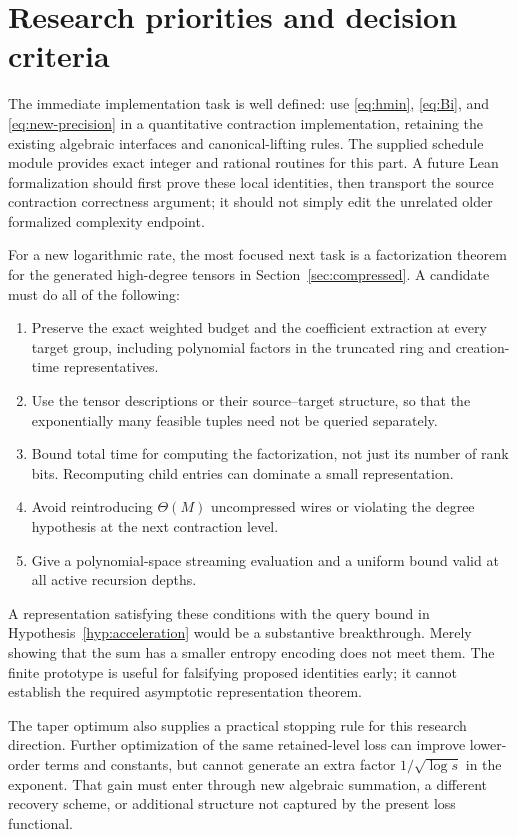 \documentclass[11pt,letterpaper]{article}
\numberwithin{equation}{section}
\theoremstyle{definition}
\theoremstyle{remark}
\begin{document}
\section{Research priorities and decision criteria}
\label{sec:research}

The immediate implementation task is well defined: use
\eqref{eq:hmin}, \eqref{eq:Bi}, and \eqref{eq:new-precision} in a
quantitative contraction implementation, retaining the existing algebraic
interfaces and canonical-lifting rules. The supplied schedule module
provides exact integer and rational routines for this part. A future Lean
formalization should first prove these local identities, then transport
the source contraction correctness argument; it should not simply edit
the unrelated older formalized complexity endpoint.

For a new logarithmic rate, the most focused next task is a factorization
theorem for the generated high-degree tensors in Section~\ref{sec:compressed}.
A candidate must do all of the following:
\begin{enumerate}
\item Preserve the exact weighted budget and the coefficient extraction at
      every target group, including polynomial factors in the truncated
      ring and creation-time representatives.
\item Use the tensor descriptions or their source--target structure, so
      that the exponentially many feasible tuples need not be queried
      separately.
\item Bound total time for computing the factorization, not just its
      number of rank bits. Recomputing child entries can dominate a small
      representation.
\item Avoid reintroducing $\Theta(M)$ uncompressed wires or violating the
      degree hypothesis at the next contraction level.
\item Give a polynomial-space streaming evaluation and a uniform bound
      valid at all active recursion depths.
\end{enumerate}

A representation satisfying these conditions with the query bound in
Hypothesis~\ref{hyp:acceleration} would be a substantive breakthrough.
Merely showing that the sum has a smaller entropy encoding does not meet
them. The finite prototype is useful for falsifying proposed identities
early; it cannot establish the required asymptotic representation theorem.

The taper optimum also supplies a practical stopping rule for this
research direction. Further optimization of the same retained-level loss
can improve lower-order terms and constants, but cannot generate an extra
factor $1/\sqrt{\log s}$ in the exponent. That gain must enter through
new algebraic summation, a different recovery scheme, or additional
structure not captured by the present loss functional.
\end{document}
